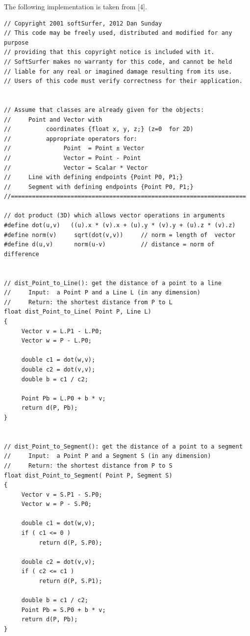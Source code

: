 \documentclass[12pt]{article}
\begin{document}
The following implementation is taken from [4].
\begin{lstlisting}
// Copyright 2001 softSurfer, 2012 Dan Sunday
// This code may be freely used, distributed and modified for any purpose
// providing that this copyright notice is included with it.
// SoftSurfer makes no warranty for this code, and cannot be held
// liable for any real or imagined damage resulting from its use.
// Users of this code must verify correctness for their application.
 

// Assume that classes are already given for the objects:
//     Point and Vector with
//          coordinates {float x, y, z;} (z=0  for 2D)
//          appropriate operators for:
//               Point  = Point ± Vector
//               Vector = Point - Point
//               Vector = Scalar * Vector
//     Line with defining endpoints {Point P0, P1;}
//     Segment with defining endpoints {Point P0, P1;}
//===================================================================

// dot product (3D) which allows vector operations in arguments
#define dot(u,v)   ((u).x * (v).x + (u).y * (v).y + (u).z * (v).z)
#define norm(v)     sqrt(dot(v,v))     // norm = length of  vector
#define d(u,v)      norm(u-v)          // distance = norm of difference


// dist_Point_to_Line(): get the distance of a point to a line
//     Input:  a Point P and a Line L (in any dimension)
//     Return: the shortest distance from P to L
float dist_Point_to_Line( Point P, Line L)
{
     Vector v = L.P1 - L.P0;
     Vector w = P - L.P0;

     double c1 = dot(w,v);
     double c2 = dot(v,v);
     double b = c1 / c2;

     Point Pb = L.P0 + b * v;
     return d(P, Pb);
}


// dist_Point_to_Segment(): get the distance of a point to a segment
//     Input:  a Point P and a Segment S (in any dimension)
//     Return: the shortest distance from P to S
float dist_Point_to_Segment( Point P, Segment S)
{
     Vector v = S.P1 - S.P0;
     Vector w = P - S.P0;

     double c1 = dot(w,v);
     if ( c1 <= 0 )
          return d(P, S.P0);

     double c2 = dot(v,v);
     if ( c2 <= c1 )
          return d(P, S.P1);

     double b = c1 / c2;
     Point Pb = S.P0 + b * v;
     return d(P, Pb);
}

\end{lstlisting}
\end{document}

